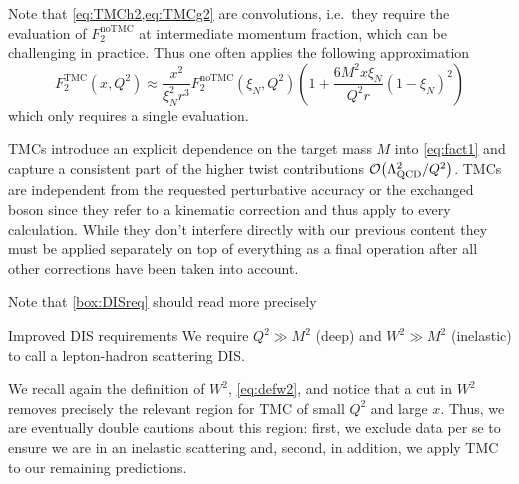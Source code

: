 Note that \cref{eq:TMCh2,eq:TMCg2} are convolutions, i.e.\ they require the evaluation of $F_2^\text{noTMC}$ at intermediate momentum fraction, which can be challenging in practice.
Thus one often applies the following approximation~\cite{Schienbein:2007gr}
\begin{equation}
    F_2^\text{TMC}(x,Q^2) \approx \frac{x^2}{\xi_N^2 r^3} F_2^\text{noTMC}(\xi_N, Q^2) \left(1 + \frac{6 M^2 x \xi_N}{Q^2 r}(1-\xi_N)^2\right)
\end{equation}
which only requires a single evaluation.

TMCs introduce an explicit dependence on the target mass $M$ into \cref{eq:fact1} and capture a consistent part of the higher twist contributions $\order{\LQCD^2/Q^2}$.
TMCs are independent from the requested perturbative accuracy or the exchanged boson since they refer to a kinematic correction and thus apply to every calculation.
While they don't interfere directly with our previous content they must be applied separately on top of everything as a final operation after all other corrections have been taken into account.

Note that \cref{box:DISreq} should read more precisely
\begin{conclusionbox}[label={box:DISreqM}]{Improved DIS requirements}
    We require $Q^2 \gg M^2$ (deep) and $W^2 \gg M^2$ (inelastic) to call a lepton-hadron scattering DIS.
\end{conclusionbox}
\noindent{}We recall again the definition of $W^2$, \cref{eq:defw2}, and notice that a cut in $W^2$ removes precisely the relevant region for TMC of small $Q^2$ and large $x$.
Thus, we are eventually double cautions about this region: first, we exclude data per se to ensure we are in an inelastic scattering and, second, in addition, we apply TMC to our remaining predictions.
